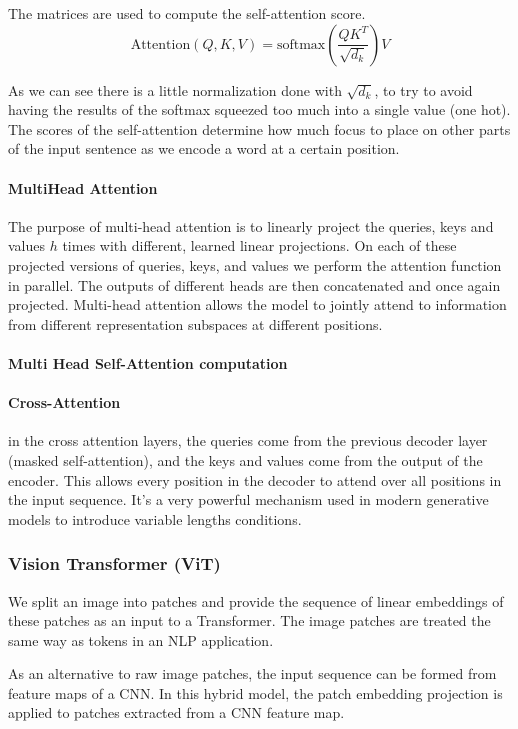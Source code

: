 The matrices are used to compute the self-attention score.
$$\text{Attention}(Q,K,V)=\text{softmax}(\frac{QK^T}{\sqrt{d_k}})V$$

As we can see there is a little normalization done with $\sqrt{d_k}$, to try to avoid having the results of the softmax squeezed too much into a single value (one hot).
The scores of the self-attention determine how much focus to place on other parts of the input sentence as we encode a word at a certain position.

\paragraph{MultiHead Attention}
The purpose of multi-head attention is to linearly project the queries, keys and values $h$ times with different, learned linear projections.
On each of these projected versions of queries, keys, and values we perform the attention function in parallel.
The outputs of different heads are then concatenated and once again projected.
Multi-head attention allows the model to jointly attend to information from different representation subspaces at different positions.

\paragraph{Multi Head Self-Attention computation}

\paragraph{Cross-Attention}
in the cross attention layers, the queries come from the previous decoder layer (masked self-attention), and the keys and values come from the output of the encoder.
This allows every position in the decoder to attend over all positions in the input sequence.
It's a very powerful mechanism used in modern generative models to introduce variable lengths conditions.


\subsubsection{Vision Transformer (ViT)}
We split an image into patches and provide the sequence of linear embeddings of these patches as an input to a Transformer.
The image patches are treated the same way as tokens in an NLP application.

As an alternative to raw image patches, the input sequence can be formed from feature maps of a CNN.
In this hybrid model, the patch embedding projection is applied to patches extracted from a CNN feature map.

